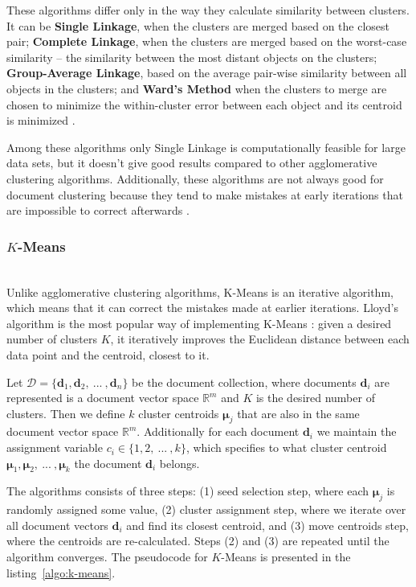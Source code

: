 These algorithms differ only in the way they calculate similarity between
clusters. It can be \textbf{Single Linkage}, when the clusters are merged based
on the closest pair; \textbf{Complete Linkage}, when the clusters are merged
based on the worst-case similarity -- the similarity between the most
distant objects on the clusters; \textbf{Group-Average Linkage}, based
on the average pair-wise similarity between all objects in the clusters;
and \textbf{Ward's Method} when the clusters to merge are chosen to
minimize the within-cluster error between each object and its centroid
is minimized \cite{oikonomakou2005review}.

Among these algorithms only Single Linkage is computationally feasible
for large data sets, but it doesn't give good results compared to other
agglomerative clustering algorithms. Additionally, these algorithms
are not always good for document clustering because they tend to
make mistakes at early iterations that are impossible to correct
afterwards \cite{steinbach2000comparison}.



\subsubsection{$K$-Means} \label{sec:kmeans} \ \\

Unlike agglomerative clustering algorithms, K-Means is an iterative
algorithm, which means that it can correct the mistakes made
at earlier iterations. Lloyd's algorithm is the most popular way
of implementing K-Means \cite{xu2005survey}: given a desired number of clusters $K$,
it iteratively improves the Euclidean distance between each data
point and the centroid, closest to it.


Let $\mathcal D = \{  \mathbf d_1, \mathbf d_2, \ ... \ , \mathbf d_n \}$
be the document collection, where documents $\mathbf d_i$ are represented
is a document vector space $\mathbb R^m$ and $K$ is the desired
number of clusters. Then we define $k$ cluster centroids $\boldsymbol \mu_j$ that are
also in the same document vector space $\mathbb R^m$.
Additionally for each document $\mathbf d_i$ we maintain the assignment
variable $c_i \in \{ 1, 2, \ ... \ , k \}$, which specifies to what
cluster centroid $\boldsymbol \mu_1, \boldsymbol \mu_2, \ ... \ , \boldsymbol \mu_k$
the document $\mathbf d_i$ belongs.


The algorithms consists of three steps: (1) seed selection step,
where each $\boldsymbol \mu_j$ is randomly assigned some value,
(2) cluster assignment step, where we iterate over all document vectors
$\mathbf d_i$ and find its closest centroid, and (3)  move centroids step,
where the centroids are re-calculated. Steps (2) and (3) are repeated
until the algorithm converges. The pseudocode for $K$-Means is presented
in the listing~\ref{algo:k-means}.

